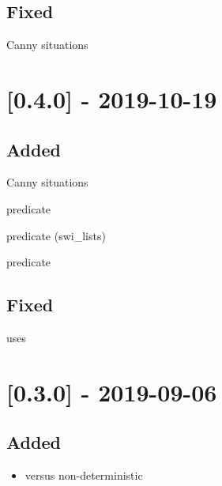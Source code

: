 \subsection{Fixed}

\begin{shortlist}
    \item Canny situations
\end{shortlist}

\section{[0.4.0] - 2019-10-19}

\subsection{Added}

\begin{shortlist}
    \item Canny situations
    \item {} predicate
    \item {} predicate (swi_lists)
    \item {} predicate
\end{shortlist}

\subsection{Fixed}

\begin{shortlist}
    \item {} uses 
\end{shortlist}

\section{[0.3.0] - 2019-09-06}

\subsection{Added}

\begin{itemize}
    \item {} versus non-deterministic 
\end{itemize}

